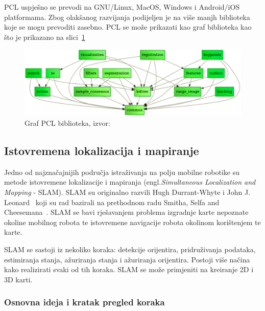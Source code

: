 PCL uspješno se prevodi na GNU/Linux, MacOS, Windows i Android/iOS
platformama. Zbog olakšanog razvijanja podijeljen je na više manjh
biblioteka koje se mogu prevoditi zasebno. PCL se može prikazati kao
graf biblioteka kao što je prikazano na slici~\ref{fig:pcl-graph.png}

\setcounter{figure}{0}
\begin{figure}[h]
\renewcommand{\figurename}{Grafikon}
\centering
\includegraphics[scale=0.40]{figures/pcl-graph.png}
\caption{Graf PCL biblioteka, izvor:~\cite{web:pcl}}
\label{fig:pcl-graph.png}
\end{figure}



\newpage
\subsection{Istovremena lokalizacija i mapiranje} %
\label{sub:Slam}
Jedno od najznačajnijih područja istraživanja na polju mobilne robotike
su metode istovremene lokalizacije i mapiranja
(engl.\textit{Simultaneous Localization and Mapping} - SLAM). SLAM su
originalno razvili Hugh Durrant-Whyte i John J.
Leonard~\cite{Durrant:91b} koji su rad bazirali na prethodnom radu
Smitha, Selfa and Cheesemana~\cite{Smith86}. SLAM se bavi rješavanjem
problema izgradnje karte nepoznate okoline mobilnog robota te istovremene
navigacije robota okolinom korištenjem te karte.

SLAM se sastoji iz nekoliko koraka: detekcije orijentira, pridruživanja
podataka, estimiranja stanja, ažuriranja stanja i ažuriranja orijentira.
Postoji više načina kako realizirati svaki od tih koraka. SLAM se može
primjeniti na kreiranje 2D i 3D karti.

\subsubsection{Osnovna ideja i kratak pregled koraka} %
\label{ssub:Osnovna ideja } 

